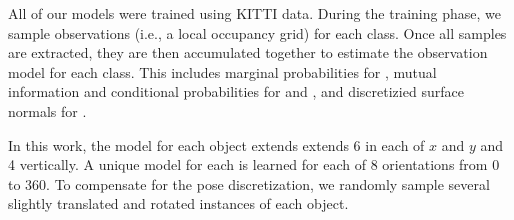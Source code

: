 All of our models were trained using KITTI data. During the training phase, we
sample observations (i.e., a local occupancy grid) for each class. Once all samples are
extracted, they are then accumulated together to estimate the observation model
for each class. This includes marginal probabilities for
, mutual information and conditional probabilities for
 and , and discretizied surface normals
for .

In this work, the model for each object extends extends \unit{6}{\m} in each of $x$ and $y$
and \unit{4}{\m} vertically. A unique model for each is learned for each of 8
orientations from \unit{0} to \unit{360}{\deg}. To compensate for the pose
discretization, we randomly sample several slightly translated and rotated
instances of each object.
